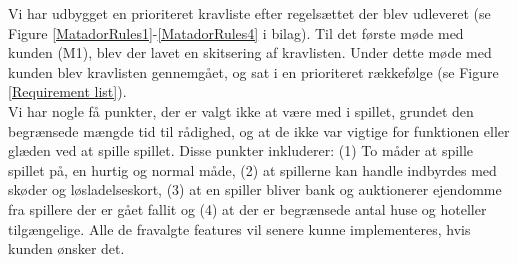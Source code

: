 \begin{flushleft}
\doublespacing
Vi har udbygget en prioriteret kravliste efter regelsættet der blev udleveret (se Figure \ref{MatadorRules1}-\ref{MatadorRules4} i bilag). Til det første møde med kunden (M1), blev der lavet en skitsering af kravlisten. Under dette møde med kunden blev kravlisten gennemgået, og sat i en prioriteret rækkefølge (se Figure \ref{Requirement list}). \\
\addlinespace[0.5cm]
Vi har nogle få punkter, der er valgt ikke at være med i spillet, grundet den begrænsede mængde tid til rådighed, og at de ikke var vigtige for funktionen eller glæden ved at spille spillet. Disse punkter inkluderer: (1) To måder at spille spillet på, en hurtig og normal måde, (2) at spillerne kan handle indbyrdes med skøder og løsladelseskort, (3) at en spiller bliver bank og auktionerer ejendomme fra spillere der er gået fallit og (4) at der er begrænsede antal huse og hoteller tilgængelige. Alle de fravalgte features vil senere kunne implementeres, hvis kunden ønsker det.  

\end{flushleft}
